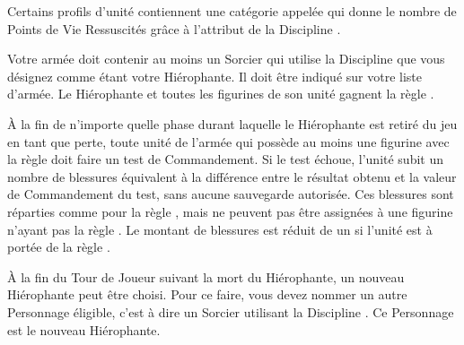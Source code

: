 \newcommand{\allcharacters}{Personnages}
\newcommand{\allundeadconstructs}{Constructions Mort-Vivantes}
\newcommand{\allwarmachines}{Machines de Guerre}
















\startarmywiderules

\armyspecialruleentry{\risen{}}

Certains profils d'unité contiennent une catégorie appelée \risen{} qui donne le nombre de Points de Vie Ressuscités grâce à l'attribut \sandattribute{} de la Discipline \sands{}.


Votre armée doit contenir au moins un Sorcier qui utilise la Discipline \sands{} que vous désignez comme étant votre Hiérophante. Il doit être indiqué sur votre liste d'armée. Le Hiérophante et toutes les figurines de son unité gagnent la règle .

\closearmywiderules








\vspace*{1.5cm}
\startarmyspecialrules

\armyspecialruleentry{\dusttodust{}}

À la fin de n'importe quelle phase durant laquelle le Hiérophante est retiré du jeu en tant que perte, toute unité de l'armée qui possède au moins une figurine avec la règle \dusttodust{} doit faire un test de Commandement. Si le test échoue, l'unité subit un nombre de blessures équivalent à la différence entre le résultat obtenu et la valeur de Commandement du test, sans aucune sauvegarde autorisée. Ces blessures sont réparties comme pour la règle \unstable{}, mais ne peuvent pas être assignées à une figurine n'ayant pas la règle \dusttodust{}. Le montant de blessures est réduit de un si l'unité est à portée de la règle \holdyourground{}.

À la fin du Tour de Joueur suivant la mort du Hiérophante, un nouveau Hiérophante peut être choisi. Pour ce faire, vous devez nommer un autre Personnage éligible, c'est à dire un Sorcier utilisant la Discipline \sands{}. Ce Personnage est le nouveau Hiérophante.

